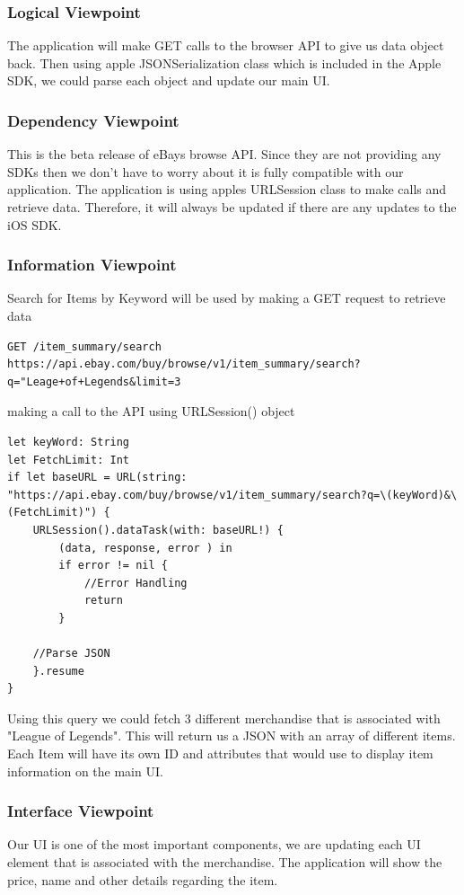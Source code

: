 \documentclass[onecolumn, draftclsnofoot,10pt, compsoc]{IEEEtran}
\begin{document}
\subsubsection{Logical Viewpoint}
The application will make GET calls to the browser API to give us data object back. Then using apple JSONSerialization class which is included in the Apple SDK, we could parse each object and update our main UI. 

\subsubsection{Dependency Viewpoint}
This is the beta release of eBays browse API. Since they are not providing any SDKs then we don't have to worry about it is fully compatible with our application. The application is using apples URLSession class to make calls and retrieve data. Therefore, it will always be updated if there are any updates to the iOS SDK. 

\subsubsection{Information Viewpoint}
Search for Items by Keyword will be used by making a GET request to retrieve data

\begin{verbatim}
GET /item_summary/search
https://api.ebay.com/buy/browse/v1/item_summary/search?q="Leage+of+Legends&limit=3
\end{verbatim}
making a call to the API using URLSession() object
\begin{verbatim}
let keyWord: String
let FetchLimit: Int
if let baseURL = URL(string: "https://api.ebay.com/buy/browse/v1/item_summary/search?q=\(keyWord)&\(FetchLimit)") {
    URLSession().dataTask(with: baseURL!) {
        (data, response, error ) in
        if error != nil {
            //Error Handling
            return
        }
        
    //Parse JSON
    }.resume
}
\end{verbatim}

\noindent Using this query we could fetch 3 different merchandise that is associated with "League of Legends". This will return us a JSON with an array of different items. Each Item will have its own ID and attributes that would use to display item information on the main UI.
\subsubsection{Interface Viewpoint}
Our UI is one of the most important components, we are updating each UI element that is associated with the merchandise. The application will show the price, name and other details regarding the item.
\end{document}
